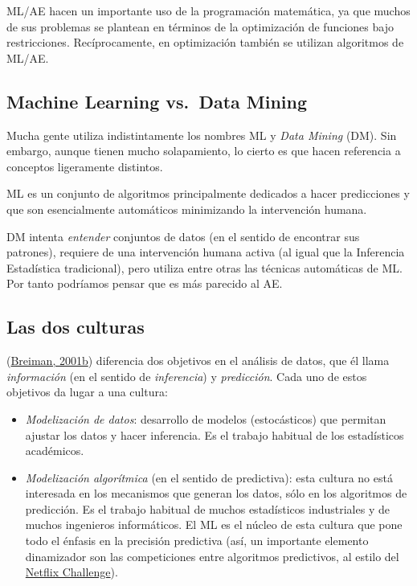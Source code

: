 \documentclass[
]{book}
\theoremstyle{break}
\theoremstyle{nonumberplain}
\begin{document}
ML/AE hacen un importante uso de la programación matemática, ya que muchos de sus problemas se plantean en términos de la optimización de funciones bajo restricciones.
Recíprocamente, en optimización también se utilizan algoritmos de ML/AE.

\hypertarget{machine-learning-vs.-data-mining}{%
\subsection{Machine Learning vs.~Data Mining}\label{machine-learning-vs.-data-mining}}

Mucha gente utiliza indistintamente los nombres ML y \emph{Data Mining} (DM).
Sin embargo, aunque tienen mucho solapamiento, lo cierto es que hacen referencia a conceptos ligeramente distintos.

ML es un conjunto de algoritmos principalmente dedicados a hacer predicciones y que son esencialmente automáticos minimizando la intervención humana.

DM intenta \emph{entender} conjuntos de datos (en el sentido de encontrar sus patrones), requiere de una intervención humana activa (al igual que la Inferencia Estadística tradicional), pero utiliza entre otras las técnicas automáticas de ML.
Por tanto podríamos pensar que es más parecido al AE.

\hypertarget{las-dos-culturas}{%
\subsection{Las dos culturas}\label{las-dos-culturas}}

(\protect\hyperlink{ref-breiman2001statistical}{Breiman, 2001b}) diferencia dos objetivos en el análisis de datos, que él llama \emph{información} (en el sentido de \emph{inferencia}) y \emph{predicción}.
Cada uno de estos objetivos da lugar a una cultura:

\begin{itemize}
\item
  \emph{Modelización de datos}: desarrollo de modelos (estocásticos) que permitan ajustar los datos y hacer inferencia.
  Es el trabajo habitual de los estadísticos académicos.
\item
  \emph{Modelización algorítmica} (en el sentido de predictiva): esta cultura no está interesada en los mecanismos que generan los datos, sólo en los algoritmos de predicción.
  Es el trabajo habitual de muchos estadísticos industriales y de muchos ingenieros informáticos.
  El ML es el núcleo de esta cultura que pone todo el énfasis en la precisión predictiva (así, un importante elemento dinamizador son las competiciones entre algoritmos predictivos, al estilo del \href{https://en.wikipedia.org/wiki/Netflix_Prize}{Netflix Challenge}).
\end{itemize}
\end{document}
